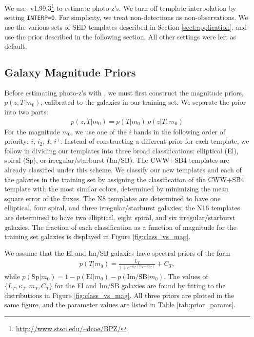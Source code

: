 We use \bpz-v1.99.3\footnote{\url{http://www.stsci.edu/~dcoe/BPZ/}} to estimate photo-z's.
We turn off template interpolation by setting \texttt{INTERP=0}.
For simplicity, we treat non-detections as non-observations.
We use the various sets of SED templates described in Section \ref{sect:application}, and use the prior described in the following section.
All other settings were left as default.


\subsection{Galaxy Magnitude Priors}

Before estimating photo-z's with \bpz, we must first construct the magnitude priors, $p(z,T|m_0)$, calibrated to the galaxies in our training set.
We separate the prior into two parts:
\begin{align}
    p(z,T|m_0) = p(T|m_0) \, p(z|T,m_0)
\end{align}
For the magnitude $m_0$, we use one of the $i$ bands in the following order of priority: $i$, $i_2$, $I$, $i^+$.
Instead of constructing a different prior for each template, we follow \citet{Benitez2000a} in dividing our templates into three broad classifications: elliptical (El), spiral (Sp), or irregular/starburst (Im/SB).
The CWW+SB4 templates are already classified under this scheme.
We classify our new templates and each of the galaxies in the training set by assigning the classification of the CWW+SB4 template with the most similar colors, determined by minimizing the mean square error of the fluxes.
The N8 templates are determined to have one elliptical, four spiral, and three irregular/starburst galaxies; the N16 templates are determined to have two elliptical, eight spiral, and six irregular/starburst galaxies.
The fraction of each classification as a function of magnitude for the training set galaxies is displayed in Figure \ref{fig:class_vs_mag}.

We assume that the El and Im/SB galaxies have spectral priors of the form
\begin{align}
    p(T|m_0) = \frac{L_T}{1+e^{-\kappa_T(m_0 - m_T)}} + C_T,
\end{align}
while $p(\text{Sp}|m_0) = 1 - p(\text{El}|m_0) - p(\text{Im/SB}|m_0)$.
The values of $\{L_T,\kappa_T,m_T,C_T\}$ for the El and Im/SB galaxies are found by fitting to the distributions in Figure \ref{fig:class_vs_mag}.
All three priors are plotted in the same figure, and the parameter values are listed in Table \ref{tab:prior_params}.

